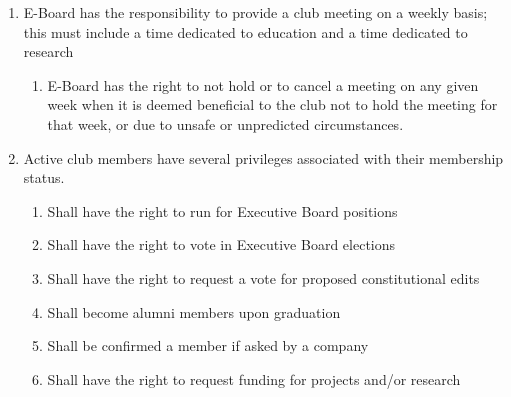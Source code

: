 

\begin{enumerate}
  \item E-Board has the responsibility to provide a club meeting on a weekly
    basis; this must include a time dedicated to education and a time dedicated
    to research
  \begin{enumerate}
    \item E-Board has the right to not hold or to cancel a meeting on any given
      week when it is deemed beneficial to the club not to hold the meeting for
      that week, or due to unsafe or unpredicted circumstances.
  \end{enumerate}
  \item Active club members have several privileges associated with their
    membership status.
  \begin{enumerate}
    \item Shall have the right to run for Executive Board positions
    \item Shall have the right to vote in Executive Board elections
    \item Shall have the right to request a vote for proposed constitutional edits 
    \item Shall become alumni members upon graduation
    \item Shall be confirmed a member if asked by a company
    \item Shall have the right to request funding for projects and/or research
  \end{enumerate}
\end{enumerate}